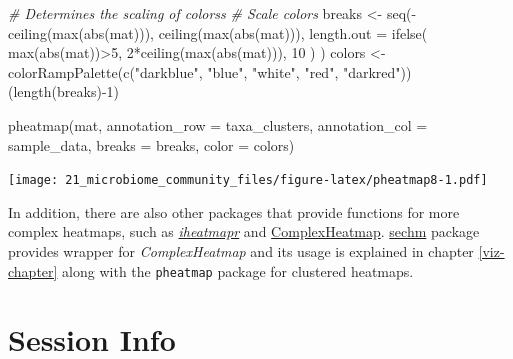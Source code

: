 \documentclass[
]{book}
\newenvironment{Shaded}{\begin{snugshade}}{\end{snugshade}}
\newcommand{\AttributeTok}[1]{\textcolor[rgb]{0.77,0.63,0.00}{#1}}
\newcommand{\CommentTok}[1]{\textcolor[rgb]{0.56,0.35,0.01}{\textit{#1}}}
\newcommand{\DecValTok}[1]{\textcolor[rgb]{0.00,0.00,0.81}{#1}}
\newcommand{\FunctionTok}[1]{\textcolor[rgb]{0.00,0.00,0.00}{#1}}
\newcommand{\NormalTok}[1]{#1}
\newcommand{\OtherTok}[1]{\textcolor[rgb]{0.56,0.35,0.01}{#1}}
\newcommand{\SpecialCharTok}[1]{\textcolor[rgb]{0.00,0.00,0.00}{#1}}
\newcommand{\StringTok}[1]{\textcolor[rgb]{0.31,0.60,0.02}{#1}}
\begin{document}
\begin{Shaded}
\begin{Highlighting}[]
\CommentTok{\# Determines the scaling of colorss}
\CommentTok{\# Scale colors}
\NormalTok{breaks }\OtherTok{\textless{}{-}} \FunctionTok{seq}\NormalTok{(}\SpecialCharTok{{-}}\FunctionTok{ceiling}\NormalTok{(}\FunctionTok{max}\NormalTok{(}\FunctionTok{abs}\NormalTok{(mat))), }\FunctionTok{ceiling}\NormalTok{(}\FunctionTok{max}\NormalTok{(}\FunctionTok{abs}\NormalTok{(mat))), }
              \AttributeTok{length.out =} \FunctionTok{ifelse}\NormalTok{( }\FunctionTok{max}\NormalTok{(}\FunctionTok{abs}\NormalTok{(mat))}\SpecialCharTok{\textgreater{}}\DecValTok{5}\NormalTok{, }\DecValTok{2}\SpecialCharTok{*}\FunctionTok{ceiling}\NormalTok{(}\FunctionTok{max}\NormalTok{(}\FunctionTok{abs}\NormalTok{(mat))), }\DecValTok{10}\NormalTok{ ) )}
\NormalTok{colors }\OtherTok{\textless{}{-}} \FunctionTok{colorRampPalette}\NormalTok{(}\FunctionTok{c}\NormalTok{(}\StringTok{"darkblue"}\NormalTok{, }\StringTok{"blue"}\NormalTok{, }\StringTok{"white"}\NormalTok{, }\StringTok{"red"}\NormalTok{, }\StringTok{"darkred"}\NormalTok{))(}\FunctionTok{length}\NormalTok{(breaks)}\SpecialCharTok{{-}}\DecValTok{1}\NormalTok{)}

\FunctionTok{pheatmap}\NormalTok{(mat, }\AttributeTok{annotation\_row =}\NormalTok{ taxa\_clusters, }
         \AttributeTok{annotation\_col =}\NormalTok{ sample\_data,}
         \AttributeTok{breaks =}\NormalTok{ breaks,}
         \AttributeTok{color =}\NormalTok{ colors)}
\end{Highlighting}
\end{Shaded}

\texttt{[image: 21\_microbiome\_community\_files/figure-latex/pheatmap8-1.pdf]}

In addition, there are also other packages that provide functions for more complex heatmaps,
such as \href{https://docs.ropensci.org/iheatmapr/articles/full_vignettes/iheatmapr.html}{\emph{iheatmapr}}
and \href{https://academic.oup.com/bioinformatics/article/32/18/2847/1743594?login=true}{ComplexHeatmap}.
\href{http://www.bioconductor.org/packages/release/bioc/vignettes/sechm/inst/doc/sechm.html}{sechm}
package provides wrapper for \emph{ComplexHeatmap} and its usage is explained in chapter \ref{viz-chapter}
along with the \texttt{pheatmap} package for clustered heatmaps.

\hypertarget{session-info-6}{%
\section*{Session Info}\label{session-info-6}}
\end{document}
